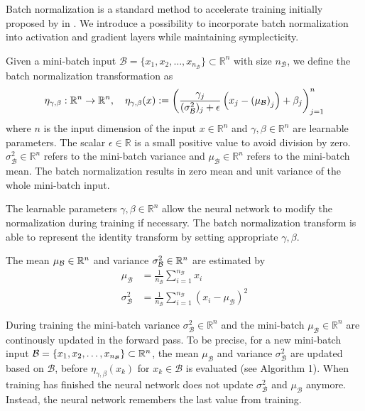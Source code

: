 \documentclass[twoside,a4paper]{article}
\begin{document}
Batch normalization is a standard method to accelerate training initially proposed by
\citeauthor{batchnorm-ioffe15} in \cite{batchnorm-ioffe15}. 
We introduce a possibility to incorporate batch normalization
into activation and gradient layers while maintaining symplecticity.


Given a mini-batch input $\mathcal{B} = \{  x_1, x_2, \dots, x_{n_{\mathcal{B}}} \} \subset \mathbb{R}^{n}$ 
with size $n_{\mathcal{B}}$, we define the batch normalization transformation as
\begin{equation*}
	\eta_{\gamma, \beta} : \mathbb{R}^n \to \mathbb{R}^n,\quad
	\eta_{\gamma, \beta}(x) 
	:= \left( \frac{\gamma_j}{(\sigma^2_\mathcal{B})_j + \epsilon} 
	\left( x_j - \left( \mu_\mathcal{B} \right)_j \right) + \beta_j \right)_{j=1}^n
\end{equation*}
where $n$ is the input dimension of the input $x \in \mathbb{R}^n$ and $\gamma, \beta \in \mathbb{R}^{n}$ 
are learnable parameters.
The scalar $\epsilon \in \mathbb{R}$ is a small positive value to avoid division by zero.
$\sigma^2_\mathcal{B} \in \mathbb{R}^{n}$ refers to the mini-batch variance and
$\mu_\mathcal{B} \in \mathbb{R}^{n}$ refers to the mini-batch mean. The batch normalization results 
in zero mean and unit variance of the whole mini-batch input.

The learnable parameters $\gamma, \beta \in \mathbb{R}^{n}$ allow the neural network to modify
the normalization during training if necessary. The batch normalization transform is able to 
represent the identity transform by setting appropriate $\gamma, \beta$.

The mean $\mu_\mathcal{B} \in \mathbb{R}^n$ and variance $\sigma^2_\mathcal{B} \in \mathbb{R}^n$ are estimated by
\begin{align*}
	\mu_\mathcal{B} &= \frac{1}{n_{\mathcal{B}}} \sum_{i=1}^{n_{\mathcal{B}}} x_i \\
	\sigma^2_\mathcal{B} &= \frac{1}{n_{\mathcal{B}}} 
	\sum_{i=1}^{n_{\mathcal{B}}} (x_i - \mu_\mathcal{B})^2
\end{align*}

During training the mini-batch variance $\sigma^2_\mathcal{B} \in \mathbb{R}^{n}$ and
the mini-batch $\mu_\mathcal{B} \in \mathbb{R}^{n}$ are continously updated in the forward pass.
To be precise, for a new mini-batch input
$\mathcal{B} = \{ x_1, x_2, \dots, x_{n_{\mathcal{B}}} \} \subset \mathbb{R}^n$, 
the mean $\mu_\mathcal{B}$ and variance $\sigma^2_\mathcal{B}$
are updated based on $\mathcal{B}$, before $\eta_{\gamma, \beta}(x_k)$ for
$x_k \in \mathcal{B}$ is evaluated (see Algorithm 1).
When training has finished the neural network does not update $\sigma_\mathcal{B}^2$ 
and $\mu_\mathcal{B}$ anymore. Instead, the neural network remembers the last value from training.
\end{document}
